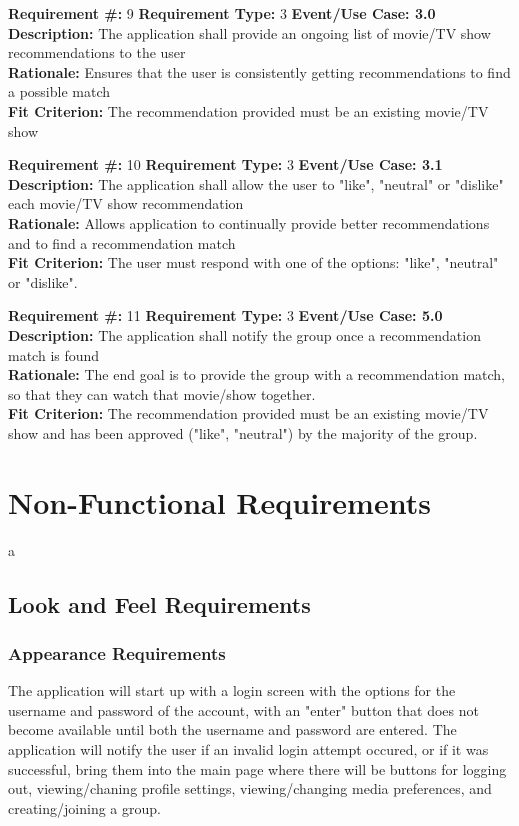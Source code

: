 \documentclass[12pt]{article}
\begin{document}
\textbf{Requirement \#:} 9 \quad \textbf{Requirement Type:} 3 \quad \textbf{Event/Use Case: 3.0}
\medskip
\\\textbf{Description:} The application shall provide an ongoing list of movie/TV show recommendations to the user
\\\textbf{Rationale:} Ensures that the user is consistently getting recommendations to find a possible match
\\\textbf{Fit Criterion:} The recommendation provided must be an existing movie/TV show

\bigskip
\textbf{Requirement \#:} 10 \quad \textbf{Requirement Type:} 3 \quad \textbf{Event/Use Case: 3.1}
\medskip
\\\textbf{Description:} The application shall allow the user to "like", "neutral" or "dislike" each movie/TV show recommendation
\\\textbf{Rationale:} Allows application to continually provide better recommendations and to find a recommendation match
\\\textbf{Fit Criterion:} The user must respond with one of the options: "like", "neutral" or "dislike".

\bigskip
\textbf{Requirement \#:} 11 \quad \textbf{Requirement Type:} 3 \quad \textbf{Event/Use Case: 5.0}
\medskip
\\\textbf{Description:} The application shall notify the group once a recommendation match is found
\\\textbf{Rationale:} The end goal is to provide the group with a recommendation match, so that they can watch that movie/show together.
\\\textbf{Fit Criterion:} The recommendation provided must be an existing movie/TV show and has been approved ("like", "neutral") by the majority of the group. 


\section{Non-Functional Requirements}
a

\subsection{Look and Feel Requirements}


\subsubsection{Appearance Requirements}
The application will start up with a login screen with the options for the username and password of the account, with an "enter" button that does not become available until both the username and password are entered. 
The application will notify the user if an invalid login attempt occured, or if it was successful, bring them into the main page where there will be buttons for logging out, viewing/chaning profile settings, viewing/changing 
media preferences, and creating/joining a group.
\end{document}
